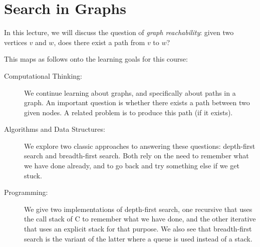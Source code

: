 \chapter{Search in Graphs}
\label{ch:graphsearch}

\newcommand{\lecnum}{24}
\newcommand{\lecturer}{Frank Pfenning, Andr\'e Platzer, Rob Simmons,\\
  Penny Anderson, Iliano Cervesato}

\maketitle

\begin{preamble}
\noindent
In this lecture, we will discuss the question of \emph{graph
  reachability}: given two vertices $v$ and $w$, does there exist a
path from $v$ to $w$?
\end{preamble}

\begin{gram}
This maps as follows onto the learning goals for this course:
\begin{description}
\item[Computational Thinking: ]%
  We continue learning about graphs, and specifically about paths in a
  graph.  An important question is whether there exists a path between
  two given nodes.  A related problem is to produce this path (if it
  exists).
\item[Algorithms and Data Structures: ]%
  We explore two classic approaches to answering these questions:
  depth-first search and breadth-first search.  Both rely on the need
  to remember what we have done already, and to go back and try
  something else if we get stuck.
\item[Programming: ]%
  We give two implementations of depth-first search, one recursive
  that uses the call stack of C to remember what we have done, and the
  other iterative that uses an explicit stack for that purpose.  We
  also see that breadth-first search is the variant of the latter
  where a queue is used instead of a stack.
\end{description}
\end{gram}

